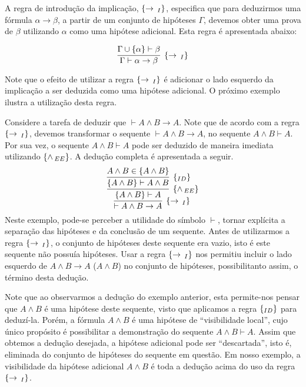 A regra de introdu\c{c}\~ao da implica\c{c}\~ao, $\scriptsize{\{\to\,_I\}}$, especifica
que para deduzirmos uma f\'ormula $\alpha\to\beta$, a partir de um
conjunto de hip\'oteses $\Gamma$, devemos obter uma prova de $\beta$
utilizando $\alpha$ como uma hip\'otese adicional. Esta regra \'e
apresentada abaixo:

\[
     \infer[\impI]{\Gamma \vdash \alpha \to \beta}
                        {\Gamma \cup \{\alpha\}\vdash \beta}
\]

Note que o efeito de utilizar a regra $\scriptsize{\{\to\,_I\}}$ \'e adicionar o lado
esquerdo da implica\c{c}\~ao a ser deduzida como uma hip\'otese
adicional. O pr\'oximo exemplo ilustra a utiliza\c{c}\~ao desta regra.

\begin{Example}
   Considere a tarefa de deduzir que $\vdash A \land B \to A$. Note
   que de acordo com a regra $\scriptsize{\{\to\,_I\}}$, devemos transformar o sequente
   $\vdash A \land B \to A$, no sequente $A \land B \vdash A$. Por sua
   vez, o sequente $A \land B \vdash A$ pode ser deduzido de maneira
   imediata utilizando $\scriptsize{\{\land\,_{EE}\}}$. A dedu\c{c}\~ao completa \'e
   apresentada a seguir.
   \[
       \infer[\impI]{\vdash A \land B \to A}
                          {
                            \infer[\andEE]{\{A\land B\} \vdash A}
                                                 {
                                                   \infer[\Id]{\{A\land
                                                     B\} \vdash A
                                                     \land B}
                                                     {A\land B \in
                                                       \{A\land B\}}
                                                 }
                          }
   \]
Neste exemplo, pode-se perceber a utilidade do s\'imbolo $\vdash$,
tornar expl\'icita a separa\c{c}\~ao das hip\'oteses e da conclus\~ao
de um sequente. Antes de utilizarmos a regra $\scriptsize{\{\to\,_I\}}$, o conjunto de
hip\'oteses deste sequente era vazio, isto \'e este sequente n\~ao
possu\'ia hip\'oteses. Usar a regra $\scriptsize{\{\to\,_I\}}$ nos permitiu incluir o
lado esquerdo de $A\land B \to A$ ($A \land B$) no conjunto de
hip\'oteses, possibilitanto assim, o t\'ermino desta dedu\c{c}\~ao.
\end{Example}

Note que ao observarmos a dedu\c{c}\~ao do exemplo anterior, esta permite-nos pensar
que $A \land B$ \'e uma hip\'otese deste sequente, visto que aplicamos
a regra $\scriptsize{\{_{ID}\}}$ para deduz\'i-la. Por\'em, a f\'ormula $A \land B$ \'e
uma hip\'otese de ``visibilidade local'', cujo \'unico prop\'osito \'e
possibilitar a demonstra\c{c}\~ao do sequente $A\land B \vdash
A$. Assim que obtemos a dedu\c{c}\~ao desejada, a hip\'otese adicional
pode ser ``descartada'', isto \'e, eliminada do conjunto de
hip\'oteses do sequente em quest\~ao. Em nosso exemplo, a visibilidade
da hip\'otese adicional $A \land B$ \'e toda a dedu\c{c}\~ao acima do
uso da regra $\scriptsize{\{\to\,_I\}}$.

